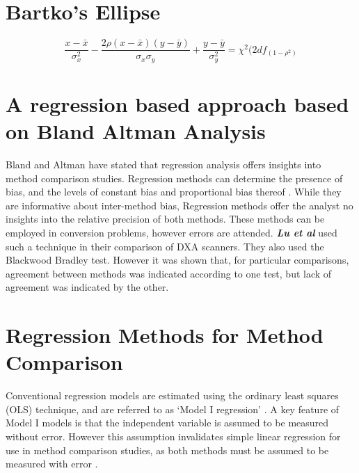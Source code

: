\documentclass[12pt, a4paper]{report}
\theoremstyle{plain}
\theoremstyle{definition}
\theoremstyle{remark}
\begin{document}
	
	
	
	
	
	\section*{Bartko's Ellipse}
	
	\[ \frac{x - \bar{x}}{\sigma^2_x} - \frac{2\rho(x - \bar{x})(y - \bar{y})}{\sigma_x \sigma_y} + \frac{y - \bar{y}}{\sigma^2_y} = \chi^2(2df_(1-\rho^2) \]
	
	

	\section{A regression based approach based on Bland Altman Analysis}
	Bland and Altman have stated that regression analysis offers insights into method comparison studies. Regression methods can determine the presence of bias, and the levels of constant bias and proportional bias thereof \cite{ludbrook97,ludbrook02}.
	While they are informative about inter-method bias, Regression methods offer the analyst no insights into the relative precision of both methods. These methods can be employed in conversion problems, however errors are
	attended.
	\emph{\textbf{Lu et al}} used such a technique in their comparison of DXA scanners. They also used the Blackwood Bradley test. However it was shown that, for particular comparisons, agreement between methods was indicated according to one test, but lack of agreement was indicated by the other.
	
	
	\section{Regression Methods for Method Comparison}
	Conventional regression models are estimated using the ordinary
	least squares (OLS) technique, and are referred to as `Model I
	regression' \citep{CornCoch,ludbrook97}. A key feature of Model I
	models is that the independent variable is assumed to be measured
	without error. However this assumption invalidates simple linear
	regression for use in method comparison studies, as both methods
	must be assumed to be measured with error \citep{BA83,ludbrook97}.
	
\end{document}
